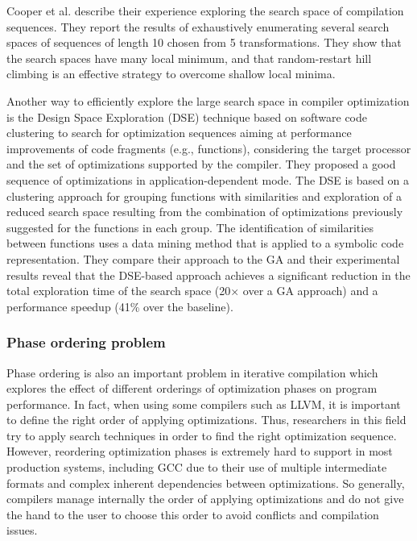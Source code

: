 Cooper et al.\cite{cooper2006exploring} describe their experience exploring the search space of compilation sequences. They report the results of exhaustively enumerating several search spaces of sequences of length 10 chosen from 5 transformations. They show that the search spaces have many local minimum, and that random-restart hill climbing is an effective strategy to overcome shallow local minima.


Another way to efficiently explore the large search space in compiler optimization is the Design Space Exploration (DSE) technique based on software code clustering to search for optimization sequences aiming at performance improvements of code fragments (e.g., functions), considering the target processor and the set of optimizations supported by the compiler\cite{martins2014exploration,martins2016clustering}. They proposed a good sequence of optimizations in application-dependent mode. The DSE is based on a clustering approach for grouping functions with similarities
and exploration of a reduced search space resulting from the combination of optimizations previously suggested for the functions in each group.
The identification of similarities between functions uses a data mining method that is applied to a symbolic code representation.
They compare their approach to the GA and their experimental results reveal that the DSE-based approach achieves a significant reduction in the total exploration time of the search space (20× over a GA approach) and a performance speedup (41\% over the baseline). 




\subsubsection{Phase ordering problem}
Phase ordering is also an important problem in iterative compilation which explores the effect of different orderings of optimization phases on program performance. In fact, when using some compilers such as LLVM, it is important to define the right order of applying optimizations. Thus, researchers in this field try to apply search techniques in order to find the right optimization sequence. However, reordering optimization phases is extremely hard to support in most production systems, including GCC due to their use of multiple intermediate formats and complex inherent dependencies between optimizations. So generally, compilers manage internally the order of applying optimizations and do not give the hand to the user to choose this order to avoid conflicts and compilation issues.

